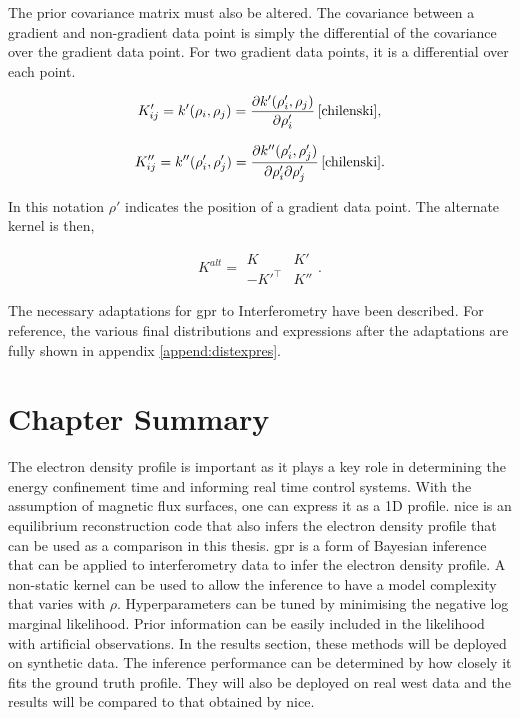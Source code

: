 \noindent The prior covariance matrix must also be altered. The covariance between a gradient and non-gradient data point is simply the differential of the covariance over the gradient data point. For two gradient data points, it is a differential over each point.

\begin{equation}
  K'_{ij} = k'(\rho_i, \rho_j) = \frac{\partial k'(\rho'_i, \rho_j)}{\partial \rho'_i} \, \cite{chilenski},
\end{equation}

\begin{equation}
  K''_{ij} = k''(\rho'_i, \rho'_j) = \frac{\partial k''(\rho'_i, \rho'_j)}{\partial \rho'_i \partial \rho'_j} \, \cite{chilenski}.
\end{equation}

\noindent In this notation $\rho'$ indicates the position of a gradient data point. The alternate kernel is then,

\begin{equation}
  K^{alt} = 
    \begin{matrix}
      K & K'\\
      -K'^{\top} & K''
    \end{matrix}.  
\end{equation}

The necessary adaptations for \gls{gpr} to Interferometry have been described. For reference, the various final distributions and expressions after the adaptations are fully shown in appendix \ref{append:distexpres}.

\section{Chapter Summary}

The electron density profile is important as it plays a key role in determining the energy confinement time and informing real time control systems. With the assumption of magnetic flux surfaces, one can express it as a 1D profile. \gls{nice} is an equilibrium reconstruction code that also infers the electron density profile that can be used as a comparison in this thesis. \gls{gpr} is a form of Bayesian inference that can be applied to interferometry data to infer the electron density profile. A non-static kernel can be used to allow the inference to have a model complexity that varies with $\rho$. Hyperparameters can be tuned by minimising the negative log marginal likelihood. Prior information can be easily included in the likelihood with artificial observations. In the results section, these methods will be deployed on synthetic data. The inference performance can be determined by how closely it fits the ground truth profile. They will also be deployed on real \gls{west} data and the results will be compared to that obtained by \gls{nice}.

